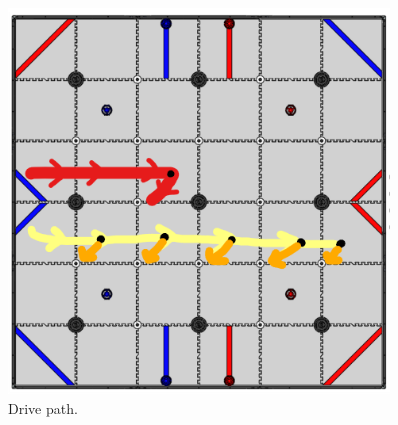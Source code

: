 \begin{figure}[htp]
\centering
\includegraphics[width=0.9\textwidth, angle=0]{Meetings/October/10-27-22/10-27-22-Path.png}
\caption{Drive path.}
\label{fig:102722_1}
\end{figure}

